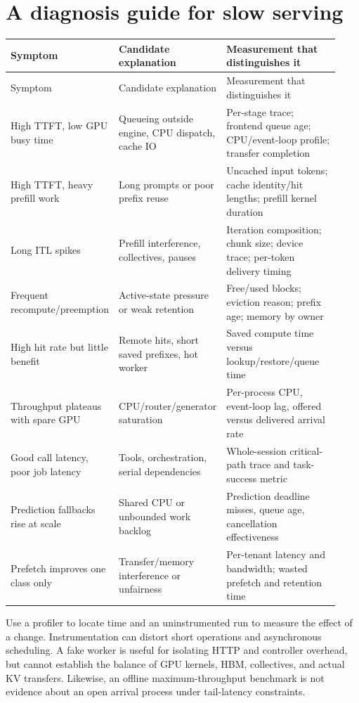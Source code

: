 \section{A diagnosis guide for slow serving}
\begin{longtable}{@{}p{0.25\linewidth}p{0.31\linewidth}p{0.37\linewidth}@{}}
\toprule Symptom & Candidate explanation & Measurement that distinguishes it\\\midrule
\endfirsthead\toprule Symptom & Candidate explanation & Measurement that distinguishes it\\\midrule\endhead
High TTFT, low GPU busy time & Queueing outside engine, CPU dispatch, cache IO & Per-stage trace; frontend queue age; CPU/event-loop profile; transfer completion\\
High TTFT, heavy prefill work & Long prompts or poor prefix reuse & Uncached input tokens; cache identity/hit lengths; prefill kernel duration\\
Long ITL spikes & Prefill interference, collectives, pauses & Iteration composition; chunk size; device trace; per-token delivery timing\\
Frequent recompute/preemption & Active-state pressure or weak retention & Free/used blocks; eviction reason; prefix age; memory by owner\\
High hit rate but little benefit & Remote hits, short saved prefixes, hot worker & Saved compute time versus lookup/restore/queue time\\
Throughput plateaus with spare GPU & CPU/router/generator saturation & Per-process CPU, event-loop lag, offered versus delivered arrival rate\\
Good call latency, poor job latency & Tools, orchestration, serial dependencies & Whole-session critical-path trace and task-success metric\\
Prediction fallbacks rise at scale & Shared CPU or unbounded work backlog & Prediction deadline misses, queue age, cancellation effectiveness\\
Prefetch improves one class only & Transfer/memory interference or unfairness & Per-tenant latency and bandwidth; wasted prefetch and retention time\\\bottomrule
\end{longtable}

Use a profiler to locate time and an uninstrumented run to measure the effect
of a change. Instrumentation can distort short operations and asynchronous
scheduling. A fake worker is useful for isolating HTTP and controller overhead,
but cannot establish the balance of GPU kernels, HBM, collectives, and actual KV
transfers. Likewise, an offline maximum-throughput benchmark is not evidence
about an open arrival process under tail-latency constraints.


